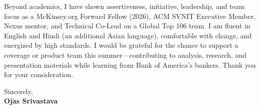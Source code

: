 \documentclass[a4paper,11pt]{article}
\begin{document}
Beyond academics, I have shown assertiveness, initiative, leadership, and team focus as a McKinsey.org Forward Fellow (2026), ACM SVNIT Executive Member, Nexus mentor, and Technical Co-Lead on a Global Top 106 team. I am fluent in English and Hindi (an additional Asian language), comfortable with change, and energized by high standards. I would be grateful for the chance to support a coverage or product team this summer---contributing to analysis, research, and presentation materials while learning from Bank of America's bankers. Thank you for your consideration.

Sincerely, \\
\vspace{8mm}
\textbf{Ojas Srivastava}
\end{document}
